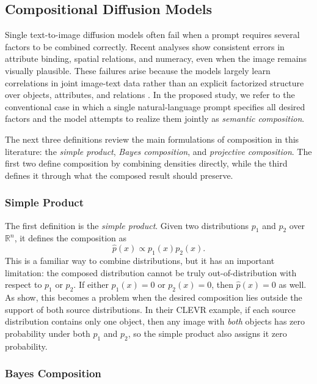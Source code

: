 
\subsection{Compositional Diffusion Models}
\label{sec:compositional_diffusion}
Single text-to-image diffusion models often fail when a prompt requires several factors to
be combined correctly. Recent analyses \citep{t2i_compbench_2025, du2024compositional,
mechanisms2025projective} show consistent errors in attribute binding, spatial relations,
and numeracy, even when the image remains visually plausible. These failures arise because
the models largely learn correlations in joint image-text data rather than an explicit
factorized structure over objects, attributes, and relations \citep{t2i_compbench_2025}.
In the proposed study, we refer to the conventional case in which a single natural-language prompt
specifies all desired factors and the model attempts to realize them jointly as
\emph{semantic composition}.

The next three definitions review the main formulations of composition in this literature: the \emph{simple product}, \emph{Bayes composition}, and \emph{projective composition}. 
The first two define composition by combining densities directly, while the third defines it through what the composed result should preserve.

\subsubsection{Simple Product}

The first definition is the \emph{simple product}. Given two distributions \(p_1\) and
\(p_2\) over \(\mathbb{R}^n\), it defines the composition as
\[
    \hat p(x) \propto p_1(x)p_2(x).
\]
This is a familiar way to combine distributions, but it has an important limitation: the
composed distribution cannot be truly out-of-distribution with respect to \(p_1\) or
\(p_2\). If either \(p_1(x)=0\) or \(p_2(x)=0\), then \(\hat p(x)=0\) as well. As
\citet{mechanisms2025projective} show, this becomes a problem when the desired
composition lies outside the support of both source distributions. In their CLEVR example,
if each source distribution contains only one object, then any image with \emph{both}
objects has zero probability under both \(p_1\) and \(p_2\), so the simple product also
assigns it zero probability. 

\subsubsection{Bayes Composition}

